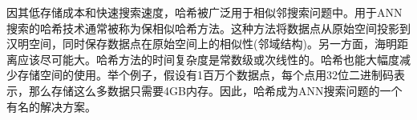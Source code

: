 \message{ !name(SGH.tex)}\documentclass[prodmode,acmtecs]{acmsmall}
\begin{document}
因其低存储成本和快速搜索速度，哈希\cite{4031381,Ny2010Semi,PMID:24136430,Zhen:2012:PMM:2339530.2339678,Zhu:2013:LCH:2502081.2502107,Song:2013:IHL:2463676.2465274,Zhang2014SHL,NIPS2014_5332}被广泛用于相似邻搜索问题中。用于ANN搜索的哈希技术通常被称为保相似哈希方法。这种方法将数据点从原始空间投影到汉明空间，同时保存数据点在原始空间上的相似性(邻域结构)。另一方面，海明距离应该尽可能大。哈希方法的时间复杂度是常数级或次线性的\cite{PMID:24136430,Zhang2014SHL}。哈希也能大幅度减少存储空间的使用。举个例子，假设有1百万个数据点，每个点用32位二进制码表示，那么存储这么多数据只需要4GB内存。因此，哈希成为ANN搜索问题的一个有名的解决方案\cite{Gionis:1999:SSH:645925.671516,Datar:2004:LHS:997817.997857,
NIPS2008_3383,Kulis2010Learning,icml2010_WangKC10,
Liu2011Hashing,PMID:24136430,W2012Isotropic,Xu2013Harmonious,Zhang2014SHL,6909650,NIPS2014_5332}。
\end{document}
